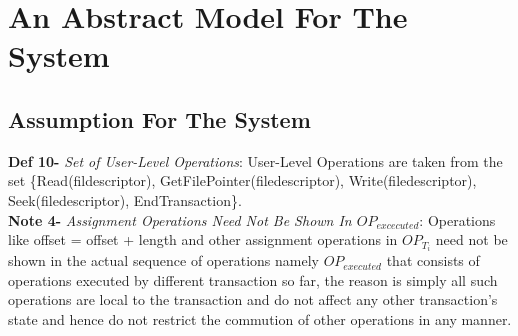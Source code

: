 \documentclass[a4paper, 11pt]{article}
\begin{document}


\section{An Abstract Model For The System}
\subsection{Assumption For The System}


\textbf{Def 10-} \emph{Set of User-Level Operations}: User-Level Operations are taken from the set \{Read(fildescriptor), GetFilePointer(filedescriptor), Write(filedescriptor), Seek(filedescriptor), EndTransaction\}.\\

\textbf{Note 4-} \emph{Assignment Operations Need Not Be Shown In $OP_{excecuted}$}: Operations like offset = offset + length and other assignment operations in $OP_{T_i}$ need not be shown in the actual sequence of operations namely $OP_{executed}$ that consists of operations executed by different transaction so far, the reason is simply all such operations are local to the transaction and do not affect any other transaction's state and hence do not restrict the commution of other operations in any manner.\\
\end{document}
